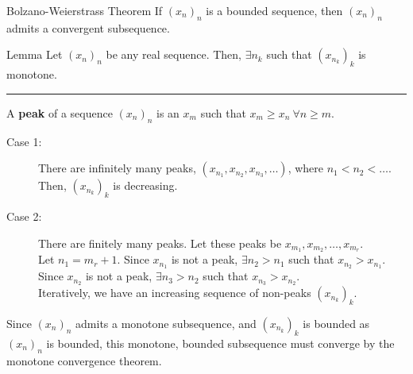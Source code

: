 \documentclass[8pt]{extarticle}
\begin{document}
  \begin{problem}{Bolzano-Weierstrass Theorem}
    If $(x_n)_n$ is a bounded sequence, then $(x_n)_n$ admits a convergent subsequence.
    \begin{problem}{Lemma}
      Let $(x_n)_n$ be any real sequence. Then, $\exists n_k$ such that $(x_{n_k})_k$ is monotone.\\
      \vspace{4pt}
      \rule{\textwidth}{0.4pt}
      \vspace{4pt}
      A \textbf{peak} of a sequence $(x_n)_n$ is an $x_m$ such that $x_m \geq x_n~\forall n\geq m$.
      \tcblower
      \begin{description}
        \item[Case 1:] There are infinitely many peaks, $(x_{n_1}, x_{n_2},x_{n_3},\dots)$, where $n_1 < n_2 < \dots$. Then, $\left(x_{n_k}\right)_k$ is decreasing.
        \item[Case 2:] There are finitely many peaks. Let these peaks be $x_{m_1},x_{m_2},\dots,x_{m_r}$.\\

          Let $n_1 = m_r + 1$. Since $x_{n_1}$ is not a peak, $\exists n_2 > n_1$ such that $x_{n_2} > x_{n_1}$. Since $x_{n_2}$ is not a peak, $\exists n_3 > n_2$ such that $x_{n_3} > x_{n_2}$.\\

          Iteratively, we have an increasing sequence of non-peaks $(x_{n_k})_k$.
      \end{description}
    \end{problem}
    \tcblower
    Since $(x_n)_n$ admits a monotone subsequence, and $(x_{n_k})_k$ is bounded as $(x_n)_n$ is bounded, this monotone, bounded subsequence must converge by the monotone convergence theorem.
  \end{problem}
\end{document}
